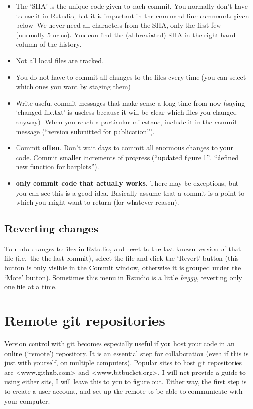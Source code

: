\documentclass[]{book}
\providecommand{\tightlist}{%
  \setlength{\itemsep}{0pt}\setlength{\parskip}{0pt}}
\begin{document}
\begin{itemize}
\tightlist
\item
  The `SHA' is the unique code given to each commit. You normally don't have to use it in Rstudio, but it is important in the command line commands given below. We never need all characters from the SHA, only the first few (normally 5 or so). You can find the (abbreviated) SHA in the right-hand column of the history.
\item
  Not all local files are tracked.
\item
  You do not have to commit all changes to the files every time (you can select which ones you want by staging them)
\item
  Write useful commit messages that make sense a long time from now (saying `changed file.txt' is useless because it will be clear which files you changed anyway). When you reach a particular milestone, include it in the commit message (``version submitted for publication'').
\item
  Commit \textbf{often}. Don't wait days to commit all enormous changes to your code. Commit smaller increments of progress (``updated figure 1'', ``defined new function for barplots'').
\item
  \textbf{only commit code that actually works}. There may be exceptions, but you can see this is a good idea. Basically assume that a commit is a point to which you might want to return (for whatever reason).
\end{itemize}

\hypertarget{reverting-changes}{%
\subsection{Reverting changes}\label{reverting-changes}}

To undo changes to files in Rstudio, and reset to the last known version of that file (i.e.~the the last commit), select the file and click the `Revert' button (this button is only visible in the Commit window, otherwise it is grouped under the `More' button).
Sometimes this menu in Rstudio is a little \emph{buggy}, reverting only one file at a time.

\hypertarget{remotegit}{%
\section{Remote git repositories}\label{remotegit}}

Version control with git becomes especially useful if you host your code in an online (`remote') repository. It is an essential step for collaboration (even if this is just with yourself, on multiple computers). Popular sites to host git repositories are \textless www.github.com\textgreater{} and \textless www.bitbucket.org\textgreater. I will not provide a guide to using either site, I will leave this to you to figure out. Either way, the first step is to create a user account, and set up the remote to be able to communicate with your computer.
\end{document}
